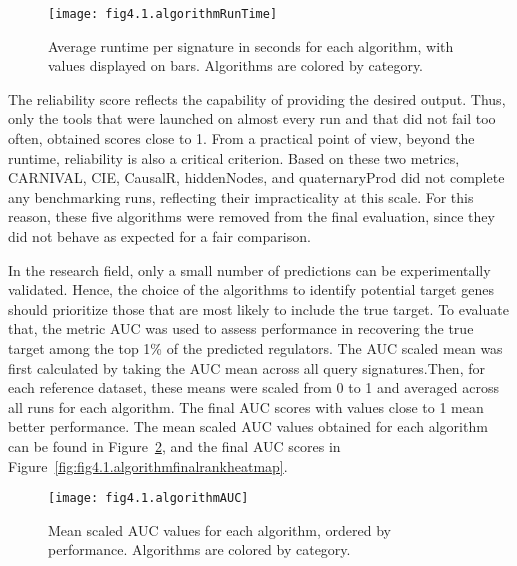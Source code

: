 \begin{figure}[htbp]
    \centering
    \texttt{[image: fig4.1.algorithmRunTime]}
    \caption[Runtime per signtures.]{Average runtime per signature in seconds for each algorithm, with values displayed on bars. Algorithms are colored by category.}
    \label{fig:fig4.1.algorithmRunTime}
\end{figure}

The reliability score reflects the capability of providing the desired output.
Thus, only the tools that were launched on almost every run and that did not fail too often, obtained scores close to 1.
From a practical point of view, beyond the runtime, reliability is also a critical criterion.
Based on these two metrics, \gls{CARNIVAL}, \gls{CIE}, CausalR, hiddenNodes, and quaternaryProd did not complete any benchmarking runs, reflecting their impracticality at this scale.
For this reason, these five algorithms were removed from the final evaluation, since they did not behave as expected for a fair comparison. 

In the research field, only a small number of predictions can be experimentally validated.
Hence, the choice of the algorithms to identify potential target genes should prioritize those that are most likely to include the true target.
To evaluate that, the metric \gls{AUC} was used to assess performance in recovering the true target among the top 1\% of the predicted regulators.
The \gls{AUC} scaled mean was first calculated by taking the \gls{AUC} mean across all query signatures.Then, for each reference dataset, these means were scaled from 0 to 1 and averaged across all runs for each algorithm.
The final \gls{AUC} scores with values close to 1 mean better performance.
The mean scaled \gls{AUC} values obtained for each algorithm can be found in Figure~\ref{fig:fig4.1.algorithmAUC}, and the final \gls{AUC} scores in Figure~\ref{fig:fig4.1.algorithmfinalrankheatmap}. 

\begin{figure}[htbp]
    \centering
    \texttt{[image: fig4.1.algorithmAUC]}
    \caption[Mean scaled \gls{AUC} values for each algorithm.]{Mean scaled \gls{AUC} values for each algorithm, ordered by performance. Algorithms are colored by category.}
    \label{fig:fig4.1.algorithmAUC}
\end{figure}

